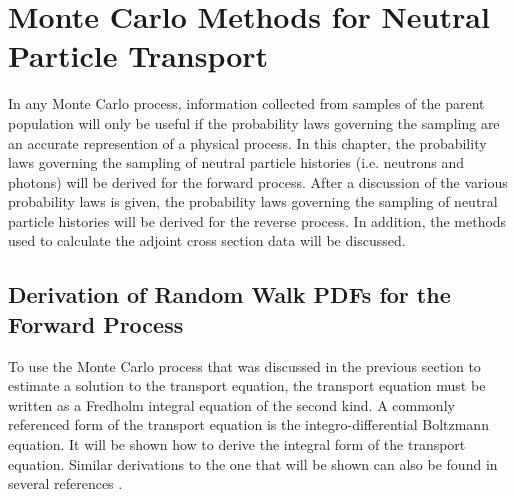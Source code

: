 \chapter{Monte Carlo Methods for Neutral Particle Transport}
\label{ch:neutral_particle_transport}
In any Monte Carlo process, information collected from samples of the parent 
population will only be useful if the probability laws governing the sampling
are an accurate represention of a physical process. In this chapter, the 
probability laws governing the sampling of neutral particle histories (i.e. 
neutrons and photons) will be derived for the forward process. After a 
discussion of the various probability laws is given, the probability laws
governing the sampling of neutral particle histories will be derived for the
reverse process. In addition, the methods used to calculate the adjoint
cross section data will be discussed.

\section{Derivation of Random Walk PDFs for the Forward Process}
\label{sec:der_prob_laws_for_proc}
To use the Monte Carlo process that was discussed in the previous section to
estimate a solution to the transport equation, the transport equation must
be written as a Fredholm integral equation of the second kind. A commonly
referenced form of the transport equation is the integro-differential 
Boltzmann equation. It will be shown how to derive the integral form of the
transport equation. Similar derivations to the one that will be shown can also
be found in several references \citep{lewis, hoogenboom, irving}.

